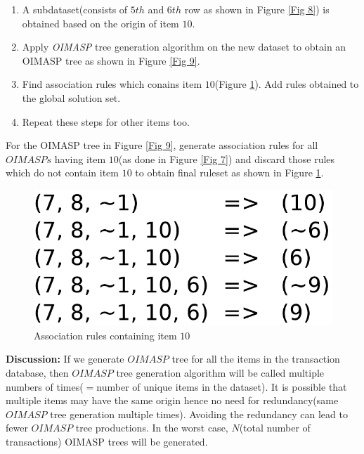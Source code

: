 \documentclass[5p, twocolumn]{elsarticle}
\begin{document}
\begin{enumerate}[Step 1.]
\item A subdataset(consists of $ 5th $ and $ 6th $ row as shown in Figure \ref{Fig 8}) is obtained based on the origin of item $ 10 $.
\item Apply \emph{OIMASP} tree generation algorithm on the new dataset to obtain an OIMASP tree as shown in Figure \ref{Fig 9}.
\item Find association rules which conains item $ 10 $(Figure \ref{Fig 10}). Add rules obtained to the global solution set.
\item Repeat these steps for other items too.
\end{enumerate}

For the OIMASP tree in Figure \ref{Fig 9}, generate association rules for all $ OIMASPs $ having item $ 10 $(as done in Figure \ref{Fig 7}) and discard those rules which do not contain item $ 10 $ to obtain final ruleset as shown in Figure \ref{Fig 10}.

\begin{figure}
\begin{center}
\includegraphics[scale=0.35]{pdf/arules10}
\end{center}
\caption{Association rules containing item $ 10 $}
\label{Fig 10}
\end{figure}

\textbf{Discussion:} If we generate $ OIMASP $ tree for all the items in the transaction database, then $ OIMASP $ tree generation algorithm will be called multiple numbers of times($ = $number of unique items in the dataset). It is possible that multiple items may have the same origin hence no need for redundancy(same $ OIMASP $ tree generation multiple times). Avoiding the redundancy can lead to fewer $ OIMASP $ tree productions. In the worst case, $ N $(total number of transactions) OIMASP trees will be generated.
\end{document}
